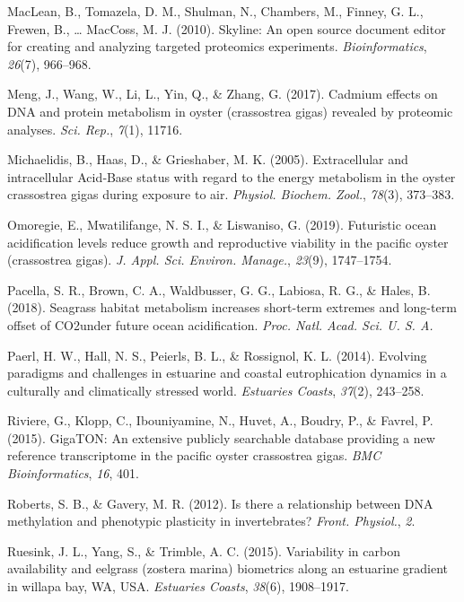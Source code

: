 \documentclass [11pt, proquest] {uwthesis}[2015/03/03]
\newlength{\cslhangindent}
\newenvironment{CSLReferences}%
{\setlength{\parindent}{0pt}%
\everypar{\setlength{\hangindent}{\cslhangindent}}\ignorespaces}%
{\par}
\begin{document}
\begin{CSLReferences}{1}{0}
\leavevmode\hypertarget{ref-MacLean2010}{}%
MacLean, B., Tomazela, D. M., Shulman, N., Chambers, M., Finney, G. L., Frewen, B., \ldots{} MacCoss, M. J. (2010). Skyline: An open source document editor for creating and analyzing targeted proteomics experiments. \emph{Bioinformatics}, \emph{26}(7), 966--968.

\leavevmode\hypertarget{ref-Meng2017}{}%
Meng, J., Wang, W., Li, L., Yin, Q., \& Zhang, G. (2017). Cadmium effects on {DNA} and protein metabolism in oyster (crassostrea gigas) revealed by proteomic analyses. \emph{Sci. Rep.}, \emph{7}(1), 11716.

\leavevmode\hypertarget{ref-Michaelidis2005}{}%
Michaelidis, B., Haas, D., \& Grieshaber, M. K. (2005). Extracellular and intracellular {Acid‐Base} status with regard to the energy metabolism in the oyster crassostrea gigas during exposure to air. \emph{Physiol. Biochem. Zool.}, \emph{78}(3), 373--383.

\leavevmode\hypertarget{ref-Omoregie2019}{}%
Omoregie, E., Mwatilifange, N. S. I., \& Liswaniso, G. (2019). Futuristic ocean acidification levels reduce growth and reproductive viability in the pacific oyster (crassostrea gigas). \emph{J. Appl. Sci. Environ. Manage.}, \emph{23}(9), 1747--1754.

\leavevmode\hypertarget{ref-Pacella2018}{}%
Pacella, S. R., Brown, C. A., Waldbusser, G. G., Labiosa, R. G., \& Hales, B. (2018). Seagrass habitat metabolism increases short-term extremes and long-term offset of {CO2under} future ocean acidification. \emph{Proc. Natl. Acad. Sci. U. S. A.}

\leavevmode\hypertarget{ref-Paerl2014}{}%
Paerl, H. W., Hall, N. S., Peierls, B. L., \& Rossignol, K. L. (2014). Evolving paradigms and challenges in estuarine and coastal eutrophication dynamics in a culturally and climatically stressed world. \emph{Estuaries Coasts}, \emph{37}(2), 243--258.

\leavevmode\hypertarget{ref-Riviere2015}{}%
Riviere, G., Klopp, C., Ibouniyamine, N., Huvet, A., Boudry, P., \& Favrel, P. (2015). {GigaTON}: An extensive publicly searchable database providing a new reference transcriptome in the pacific oyster crassostrea gigas. \emph{BMC Bioinformatics}, \emph{16}, 401.

\leavevmode\hypertarget{ref-Roberts2012}{}%
Roberts, S. B., \& Gavery, M. R. (2012). Is there a relationship between {DNA} methylation and phenotypic plasticity in invertebrates? \emph{Front. Physiol.}, \emph{2}.

\leavevmode\hypertarget{ref-Ruesink2015}{}%
Ruesink, J. L., Yang, S., \& Trimble, A. C. (2015). Variability in carbon availability and eelgrass (zostera marina) biometrics along an estuarine gradient in willapa bay, {WA}, {USA}. \emph{Estuaries Coasts}, \emph{38}(6), 1908--1917.


\end{CSLReferences}
\end{document}
